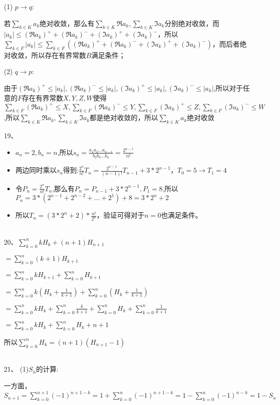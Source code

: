 \documentclass[onecolumn]{article}
\begin{document}
(1) $p\rightarrow q$:\par 
若$\sum_{k \in K}a_{k}$绝对收敛，那么有$\sum_{k\in K}\Re a_{k},\sum_{k\in K}\Im  a_{k}$分别绝对收敛，而$|a_{k}|\leq (\Re a_{k})^{+}+(\Re a_{k})^{-}+(\Im  a_{k})^{+}+(\Im  a_{k})^{-}$，所以$\sum_{k\in F}|a_{k}|\leq \sum_{k\in F}((\Re a_{k})^{+}+(\Re a_{k})^{-}+(\Im  a_{k})^{+}+(\Im  a_{k})^{-})$，而后者绝对收敛，所以存在有界常数$B$满足条件；\par
(2) $q\rightarrow p$:\par
由于$(\Re a_{k})^{+}\leq |a_{k}|,(\Re a_{k})^{-}\leq |a_{k}|,(\Im  a_{k})^{+}\leq |a_{k}|,(\Im  a_{k})^{-}\leq |a_{k}|$,所以对于任意的$F$存在有界常数$X,Y,Z,W$使得$\sum_{k\in F}(\Re a_{k})^{+}\leq X,\sum_{k\in F}(\Re a_{k})^{-}\leq Y,\sum_{k\in F}(\Im  a_{k})^{+}\leq Z,\sum_{k\in F}(\Im  a_{k})^{-}\leq W$,所以$\sum_{k\in K}\Re a_{k},\sum_{k\in K}\Im a_{k}$都是绝对收敛的，所以$\sum_{k \in K}a_{k}$绝对收敛 \par
19、\begin{itemize}
	\item $a_{n}=2,b_{n}=n$,所以$s_{n}=\frac{a_{1}a_{2}...a_{n-1}}{b_{2}b_{3}...b_{n}}=\frac{2^{n-1}}{n!}$
	\item 两边同时乘以$s_{n}$得到:$\frac{2^{n}}{n!}T_{n}=\frac{2^{n-1}}{(n-1)!}T_{n-1}+3*2^{n-1}$，$T_{0}=5\rightarrow T_{1}=4$
	\item 令$P_{n}=\frac{2^{n}}{n!}T_{n}$,那么有$P_{n}=P_{n-1}+3*2^{n-1},P_{1}=8$,所以$P_{n}=3*(2^{n-1}+2^{n-2}+...+2^{1})+8=3*2^{n}+2$
	\item 所以$T_{n}=(3*2^{n}+2)*\frac{n!}{2^{n}}$，验证可得对于$n=0$也满足条件。
\end{itemize}
~\\
20、$\sum_{k=0}^{n}kH_{k}+(n+1)H_{n+1}$ \par
$=\sum_{k=0}^{n}(k+1)H_{k+1}$\par
$=\sum_{k=0}^{n}kH_{k+1}+\sum_{k=0}^{n}H_{k+1}$\par
$=\sum_{k=0}^{n}k(H_{k}+\frac{1}{k+1})+\sum_{k=0}^{n}(H_{k}+\frac{1}{k+1})$\par
$=\sum_{k=0}^{n}kH_{k}+\sum_{k=0}^{n}\frac{k}{k+1}+\sum_{k=0}^{n}H_{k}+\sum_{k=0}^{n}\frac{1}{k+1}$\par
$=\sum_{k=0}^{n}kH_{k}+\sum_{k=0}^{n}H_{k}+n+1$\par
所以$\sum_{k=0}^{n}H_{k}=(n+1)(H_{n+1}-1)$\par
~\\
21、 (1)$S_{n}$的计算: \par
一方面，$S_{n+1}=\sum_{k=0}^{n+1}(-1)^{n+1-k}=1+\sum_{k=0}^{n}(-1)^{n+1-k}=1-\sum_{k=0}^{n}(-1)^{n-k}=1-S_{n}$\par
\end{document}
